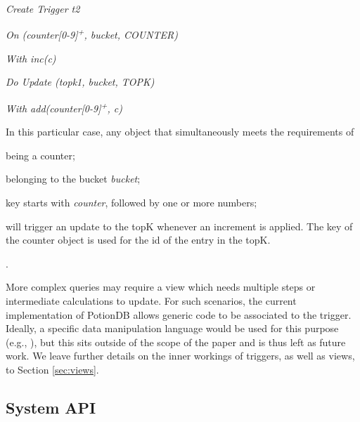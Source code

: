 \documentclass{vldb}
\newcommand{\grumbler}[2]{{\color{red}{\bf #1:} #2}}
\renewcommand{\grumbler}[2]{}
\newcommand{\andre}[1]{\grumbler{andre}{#1}}
\newcommand{\emphvspace}{0.5\baselineskip}
\newcommand{\firstblockemph}[1]{\vspace{\emphvspace}\hspace{2em}\emph{#1}}
\newcommand{\middleblockemph}[1]{\hspace{2em}\emph{#1}}
\newcommand{\lastblockemph}[1]{\hspace{2em}\emph{#1}\vspace{\emphvspace}}
\begin{document}
\firstblockemph{Create Trigger t2}

\middleblockemph{On (counter[0-9]\textsuperscript{+}, bucket, COUNTER)}

\middleblockemph{With inc(c)}

\middleblockemph{Do Update (topk1, bucket, TOPK)}

\lastblockemph{With add(counter[0-9]\textsuperscript{+}, c)}

In this particular case, any object that simultaneously meets the requirements of
\begin{enumerate*}[label=(\roman*)] 
	\item being a counter; 
	\item belonging to the bucket \emph{bucket};
	\item key starts with \emph{counter}, followed by one or more numbers;
\end{enumerate*}
will trigger an update to the topK whenever an increment is applied.
The key of the counter object is used for the id of the entry in the topK.

\andre{I added this new paragraph to explain @ custom code}.

More complex queries may require a view which needs multiple steps or intermediate calculations to update.
For such scenarios, the current implementation of PotionDB allows generic code to be associated to the trigger.
Ideally, a specific data manipulation language would be used for this purpose (e.g., \cite{oracleTriggers}), but this sits outside of the scope of the paper and is thus left as future work.
We leave further details on the inner workings of triggers, as well as views, to Section \ref{sec:views}.





\subsection{System API}



\end{document}
